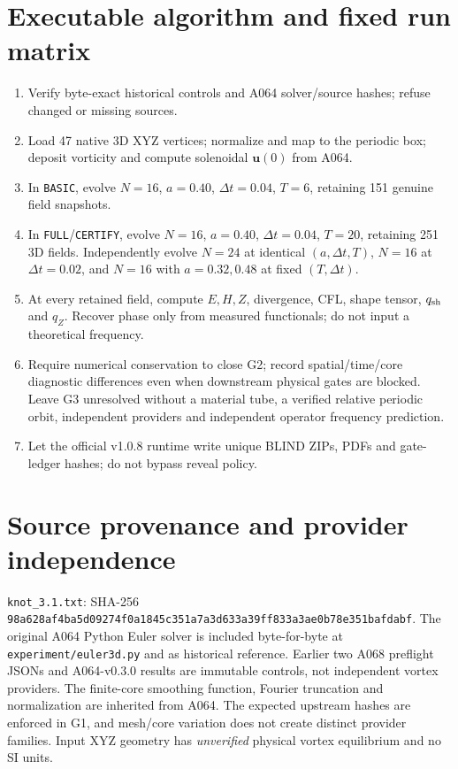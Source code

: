 \documentclass[11pt,a4paper]{article}
\begin{document}
\section{Executable algorithm and fixed run matrix}
\begin{enumerate}
\item Verify byte-exact historical controls and A064 solver/source hashes; refuse changed or missing sources.
\item Load 47 native 3D XYZ vertices; normalize and map to the periodic box; deposit vorticity and compute solenoidal $\mathbf u(0)$ from A064.
\item In \texttt{BASIC}, evolve $N=16$, $a=0.40$, $\Delta t=0.04$, $T=6$, retaining 151 genuine field snapshots.
\item In \texttt{FULL}/\texttt{CERTIFY}, evolve $N=16$, $a=0.40$, $\Delta t=0.04$, $T=20$, retaining 251 3D fields. Independently evolve $N=24$ at identical $(a,\Delta t,T)$, $N=16$ at $\Delta t=0.02$, and $N=16$ with $a=0.32,0.48$ at fixed $(T,\Delta t)$.
\item At every retained field, compute $E,H,Z$, divergence, CFL, shape tensor, $q_{\rm sh}$ and $q_Z$. Recover phase only from measured functionals; do not input a theoretical frequency.
\item Require numerical conservation to close G2; record spatial/time/core diagnostic differences even when downstream physical gates are blocked. Leave G3 unresolved without a material tube, a verified relative periodic orbit, independent providers and independent operator frequency prediction.
\item Let the official v1.0.8 runtime write unique BLIND ZIPs, PDFs and gate-ledger hashes; do not bypass reveal policy.\end{enumerate}

\section{Source provenance and provider independence}
\texttt{knot\_3.1.txt}: SHA-256 \texttt{98a628af4ba5d09274f0a1845c351a7a3d633a39ff833a3ae0b78e351bafdabf}. The original A064 Python Euler solver is included byte-for-byte at \texttt{experiment/euler3d.py} and as historical reference. Earlier two A068 preflight JSONs and A064-v0.3.0 results are immutable controls, not independent vortex providers. The finite-core smoothing function, Fourier truncation and normalization are inherited from A064. The expected upstream hashes are enforced in G1, and mesh/core variation does not create distinct provider families. Input XYZ geometry has \emph{unverified} physical vortex equilibrium and no SI units.
\end{document}
